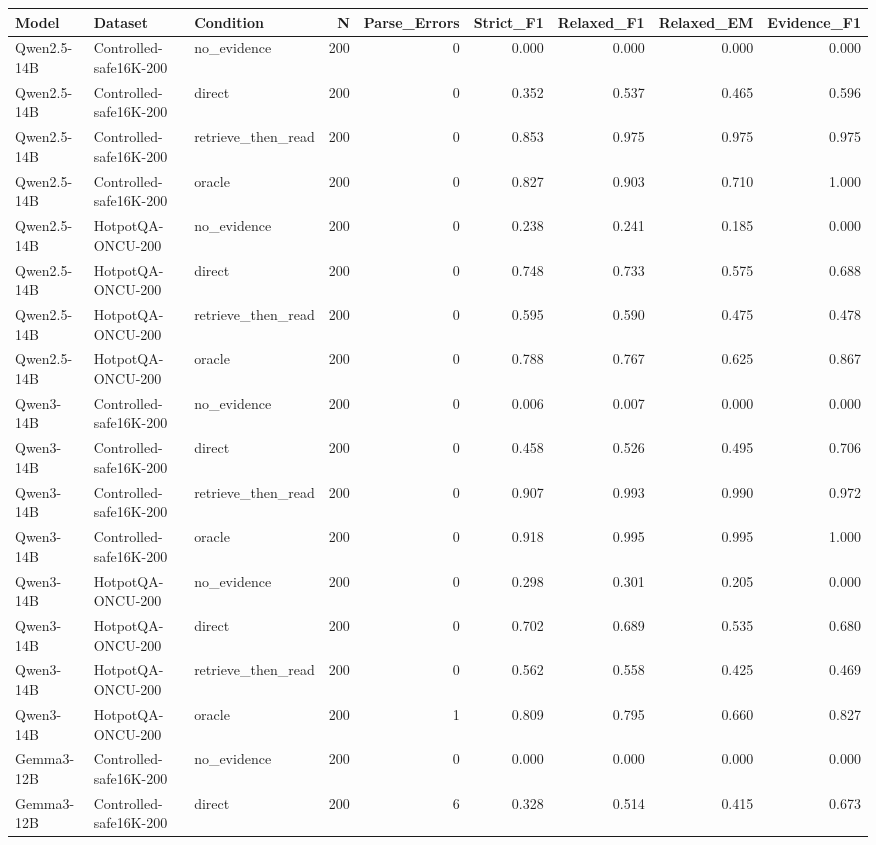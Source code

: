 \begin{tabular}{lllrrrrrr}
\toprule
Model & Dataset & Condition & N & Parse_Errors & Strict_F1 & Relaxed_F1 & Relaxed_EM & Evidence_F1 \\
\midrule
Qwen2.5-14B & Controlled-safe16K-200 & no_evidence & 200 & 0 & 0.000 & 0.000 & 0.000 & 0.000 \\
Qwen2.5-14B & Controlled-safe16K-200 & direct & 200 & 0 & 0.352 & 0.537 & 0.465 & 0.596 \\
Qwen2.5-14B & Controlled-safe16K-200 & retrieve_then_read & 200 & 0 & 0.853 & 0.975 & 0.975 & 0.975 \\
Qwen2.5-14B & Controlled-safe16K-200 & oracle & 200 & 0 & 0.827 & 0.903 & 0.710 & 1.000 \\
Qwen2.5-14B & HotpotQA-ONCU-200 & no_evidence & 200 & 0 & 0.238 & 0.241 & 0.185 & 0.000 \\
Qwen2.5-14B & HotpotQA-ONCU-200 & direct & 200 & 0 & 0.748 & 0.733 & 0.575 & 0.688 \\
Qwen2.5-14B & HotpotQA-ONCU-200 & retrieve_then_read & 200 & 0 & 0.595 & 0.590 & 0.475 & 0.478 \\
Qwen2.5-14B & HotpotQA-ONCU-200 & oracle & 200 & 0 & 0.788 & 0.767 & 0.625 & 0.867 \\
Qwen3-14B & Controlled-safe16K-200 & no_evidence & 200 & 0 & 0.006 & 0.007 & 0.000 & 0.000 \\
Qwen3-14B & Controlled-safe16K-200 & direct & 200 & 0 & 0.458 & 0.526 & 0.495 & 0.706 \\
Qwen3-14B & Controlled-safe16K-200 & retrieve_then_read & 200 & 0 & 0.907 & 0.993 & 0.990 & 0.972 \\
Qwen3-14B & Controlled-safe16K-200 & oracle & 200 & 0 & 0.918 & 0.995 & 0.995 & 1.000 \\
Qwen3-14B & HotpotQA-ONCU-200 & no_evidence & 200 & 0 & 0.298 & 0.301 & 0.205 & 0.000 \\
Qwen3-14B & HotpotQA-ONCU-200 & direct & 200 & 0 & 0.702 & 0.689 & 0.535 & 0.680 \\
Qwen3-14B & HotpotQA-ONCU-200 & retrieve_then_read & 200 & 0 & 0.562 & 0.558 & 0.425 & 0.469 \\
Qwen3-14B & HotpotQA-ONCU-200 & oracle & 200 & 1 & 0.809 & 0.795 & 0.660 & 0.827 \\
Gemma3-12B & Controlled-safe16K-200 & no_evidence & 200 & 0 & 0.000 & 0.000 & 0.000 & 0.000 \\
Gemma3-12B & Controlled-safe16K-200 & direct & 200 & 6 & 0.328 & 0.514 & 0.415 & 0.673 \\

\end{tabular}
